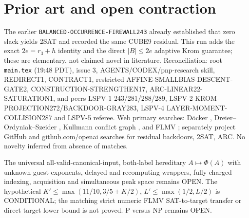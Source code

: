 \documentclass{article}
\begin{document}
\section{Prior art and open contraction}
The earlier \texttt{BALANCED-OCCURRENCE-FIREWALL243} already established that zero slack yields 2SAT and recorded the same CUBE9 residual. This run adds the exact $2e=r_3+h$ identity and the direct $|B|\le2e$ adaptive Krom guarantee; these are elementary, not claimed novel in literature. Reconciliation: root \texttt{main.tex} (19:48 PDT), issue 3, AGENTS/CODEX/pnp-research skill, REDIRECT1, CONTRACT1, restricted AFFINE-SMALLBIAS-DESCENT-GATE2, CONSTRUCTION-STRENGTHEN17, ARC-LINEAR22-SATURATION1, and peers LSPV-1 243/281/288/289, LSPV-2 KROM-PROJECTION272/BACKDOOR-GRAY283, LSPV-4 LAYER-MOMENT-COLLISION287 and LSPV-5 referee. Web primary searches: D\"ocker \cite{doecker2019}, Dreier--Ordyniak--Szeider \cite{dreier2024}, Kullmann conflict graph \cite{kullmann2011}, and FLMV \cite{flmv2005}; separately project GitHub and github.com/openai searches for residual backdoors, 2SAT, ARC. No novelty inferred from absence of matches.

\noindent The universal all-valid-canonical-input, both-label hereditary $A\mapsto\Phi(A)$ with unknown guest exponents, delayed and recomputing wrappers, fully charged indexing, acquisition and simultaneous peak space remains OPEN. The hypothetical $K'\le\max(11/10,3/5+K/2)$, $L'\le\max(1/2,L/2)$ is CONDITIONAL; the matching strict numeric FLMV SAT-to-target transfer or direct target lower bound is not proved. P versus NP remains OPEN.


\end{document}
